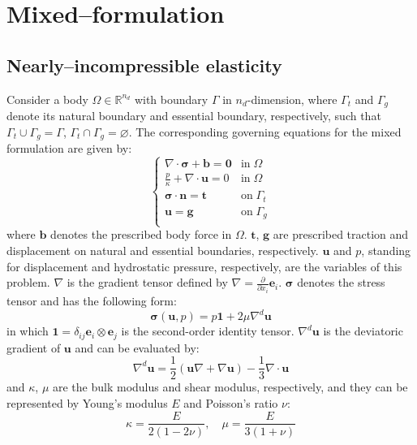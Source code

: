 \section{Mixed--formulation}
\subsection{Nearly--incompressible elasticity}
Consider a body $\Omega \in \mathbb{R}^{n_d}$ with boundary $\Gamma$ in $n_d$-dimension, where $\Gamma_t$ and $\Gamma_g$ denote its natural boundary and essential boundary, respectively, such that $\Gamma_t \cup \Gamma_g = \Gamma$, $\Gamma_t \cap \Gamma_g = \varnothing$. The corresponding governing equations for the mixed formulation are given by:
\begin{equation}\label{strong}
\begin{cases}
\nabla \cdot \boldsymbol{\sigma} + \boldsymbol{b} = \boldsymbol{0} & \mathrm{in} \; \Omega \\
\frac{p}{\kappa} + \nabla \cdot \boldsymbol{u} = 0 & \mathrm{in} \; \Omega \\
\boldsymbol{\sigma} \cdot \boldsymbol{n} = \boldsymbol{t} & \mathrm{on} \; \Gamma_t \\
\boldsymbol{u} = \boldsymbol{g} & \mathrm{on} \; \Gamma_g \\
\end{cases}
\end{equation}
where $\boldsymbol{b}$ denotes the prescribed body force in $\Omega$. $\boldsymbol{t}$, $\boldsymbol{g}$ are prescribed traction and displacement on natural and essential boundaries, respectively.
$\boldsymbol{u}$ and $p$, standing for displacement and hydrostatic pressure, respectively, are the variables of this problem.
$\nabla$ is the gradient tensor defined by $\nabla = \frac{\partial}{\partial x_i} \boldsymbol{e}_i$.
$\boldsymbol{\sigma}$ denotes the stress tensor and has the following form:
\begin{equation}\label{stress}
\boldsymbol{\sigma}(\boldsymbol{u}, p) = p \boldsymbol{1} + 2\mu \nabla^d \boldsymbol{u}
\end{equation}
in which $\boldsymbol{1} = \delta_{ij} \boldsymbol{e}_i \otimes \boldsymbol{e}_j$ is the second-order identity tensor. $\nabla^d \boldsymbol{u}$ is the deviatoric gradient of $\boldsymbol{u}$ and can be evaluated by:
\begin{equation}
\nabla^d \boldsymbol{u} = \frac{1}{2}(\boldsymbol{u} \nabla + \nabla \boldsymbol{u}) - \frac{1}{3} \nabla \cdot \boldsymbol{u}
\end{equation}
and $\kappa$, $\mu$ are the bulk modulus and shear modulus, respectively, and they can be represented by Young's modulus $E$ and Poisson's ratio $\nu$:
\begin{equation}\label{modulus}
\kappa = \frac{E}{2(1-2\nu)}, \quad \mu = \frac{E}{3(1+\nu)}
\end{equation}


